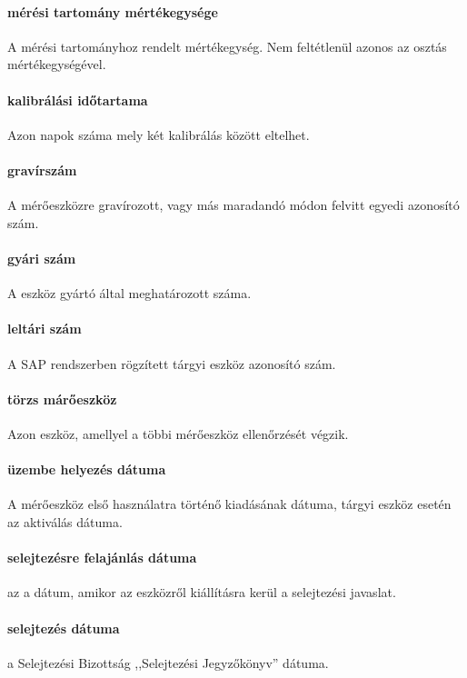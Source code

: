 \documentclass[a4paper,12pt]{report}
\begin{document}
\paragraph*{mérési tartomány mértékegysége} A mérési tartományhoz rendelt
mértékegység. Nem feltétlenül azonos az osztás mértékegységével.

\paragraph*{kalibrálási időtartama} Azon napok száma mely két kalibrálás között eltelhet.

\paragraph*{gravírszám} A mérőeszközre gravírozott, vagy más maradandó módon felvitt
egyedi azonosító szám.

\paragraph*{gyári szám} A eszköz gyártó által meghatározott száma.

\paragraph*{leltári szám} A SAP rendszerben rögzített tárgyi eszköz azonosító szám.

\paragraph*{törzs márőeszköz} Azon eszköz, amellyel a többi mérőeszköz ellenőrzését 
végzik.

\paragraph*{üzembe helyezés dátuma} A mérőeszköz első használatra történő 
kiadásának dátuma, tárgyi eszköz esetén az aktiválás dátuma.

\paragraph*{selejtezésre felajánlás dátuma} az a dátum, amikor az eszközről kiállításra
kerül a selejtezési javaslat.

\paragraph{selejtezés dátuma} a Selejtezési Bizottság ,,Selejtezési Jegyzőkönyv'' 
dátuma.
\end{document}
